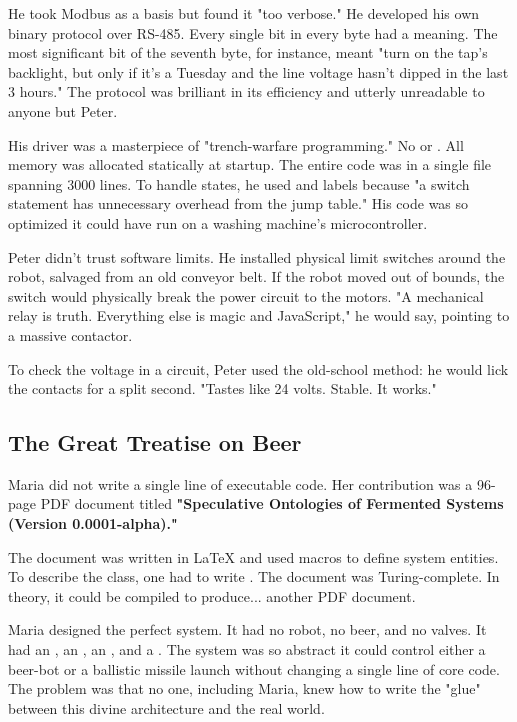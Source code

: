 He took Modbus as a basis but found it "too verbose." He developed his own binary protocol over RS-485. Every single bit in every byte had a meaning. The most significant bit of the seventh byte, for instance, meant "turn on the tap's backlight, but only if it's a Tuesday and the line voltage hasn't dipped in the last 3 hours." The protocol was brilliant in its efficiency and utterly unreadable to anyone but Peter.

His driver was a masterpiece of "trench-warfare programming." No  or . All memory was allocated statically at startup. The entire code was in a single  file spanning 3000 lines. To handle states, he used  and labels because "a switch statement has unnecessary overhead from the jump table." His code was so optimized it could have run on a washing machine's microcontroller.

Peter didn't trust software limits. He installed physical limit switches around the robot, salvaged from an old conveyor belt. If the robot moved out of bounds, the switch would physically break the power circuit to the motors. "A mechanical relay is truth. Everything else is magic and JavaScript," he would say, pointing to a massive contactor.

To check the voltage in a circuit, Peter used the old-school method: he would lick the contacts for a split second. "Tastes like 24 volts. Stable. It works."

\subsection*{The Great Treatise on Beer}

Maria did not write a single line of executable code. Her contribution was a 96-page PDF document titled \textbf{"Speculative Ontologies of Fermented Systems (Version 0.0001-alpha)."}

The document was written in LaTeX and used macros to define system entities. To describe the  class, one had to write . The document was Turing-complete. In theory, it could be compiled to produce... another PDF document.

Maria designed the perfect system. It had no robot, no beer, and no valves. It had an , an , an , and a . The system was so abstract it could control either a beer-bot or a ballistic missile launch without changing a single line of core code. The problem was that no one, including Maria, knew how to write the "glue" between this divine architecture and the real world.

